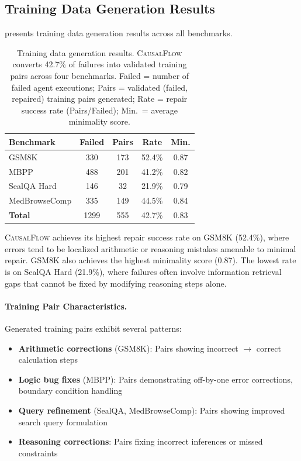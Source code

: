 \documentclass{article}
\theoremstyle{plain}
\theoremstyle{definition}
\theoremstyle{remark}
\begin{document}
\subsection{Training Data Generation Results}

 presents training data generation results across all benchmarks.

\begin{table}[t]
  \caption{Training data generation results. \textsc{CausalFlow} converts 42.7\% of failures into validated training pairs across four benchmarks. Failed = number of failed agent executions; Pairs = validated (failed, repaired) training pairs generated; Rate = repair success rate (Pairs/Failed); Min.\ = average minimality score.}
  \label{tab:main_results}
  \centering
  \begin{small}
    \begin{sc}
      \begin{tabular}{lcccc}
        \toprule
        Benchmark & Failed & Pairs & Rate & Min. \\
        \midrule
        GSM8K        & 330 & 173 & 52.4\% & 0.87 \\
        MBPP         & 488 & 201 & 41.2\% & 0.82 \\
        SealQA Hard  & 146 & 32  & 21.9\% & 0.79 \\
        MedBrowseComp& 335 & 149 & 44.5\% & 0.84 \\
        \midrule
        \textbf{Total} & 1299 & 555 & 42.7\% & 0.83 \\
        \bottomrule
      \end{tabular}
    \end{sc}
  \end{small}
\end{table}

\textsc{CausalFlow} achieves its highest repair success rate on GSM8K (52.4\%), where errors tend to be localized arithmetic or reasoning mistakes amenable to minimal repair. GSM8K also achieves the highest minimality score (0.87). The lowest rate is on SealQA Hard (21.9\%), where failures often involve information retrieval gaps that cannot be fixed by modifying reasoning steps alone.

\paragraph{Training Pair Characteristics.}
Generated training pairs exhibit several patterns:
\begin{itemize}
    \item \textbf{Arithmetic corrections} (GSM8K): Pairs showing incorrect $\rightarrow$ correct calculation steps
    \item \textbf{Logic bug fixes} (MBPP): Pairs demonstrating off-by-one error corrections, boundary condition handling
    \item \textbf{Query refinement} (SealQA, MedBrowseComp): Pairs showing improved search query formulation
    \item \textbf{Reasoning corrections}: Pairs fixing incorrect inferences or missed constraints
\end{itemize}
\end{document}
